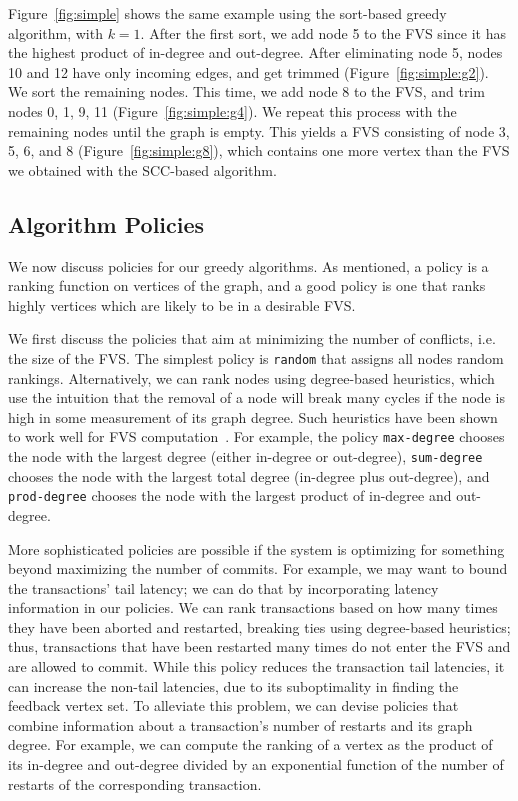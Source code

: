 Figure~\ref{fig:simple} shows the same example using the sort-based greedy algorithm, with $k = 1$. After the first sort, we add node 5 to the FVS since it has the highest product of in-degree and out-degree. After eliminating node 5, nodes 10 and 12 have only incoming edges, and get trimmed (Figure~\ref{fig:simple:g2}). We sort the remaining nodes. This time, we add node 8 to the FVS, and trim nodes 0, 1, 9, 11 (Figure~\ref{fig:simple:g4}). We repeat this process with the remaining nodes until the graph is empty. This yields a FVS consisting of node 3, 5, 6, and 8 (Figure~\ref{fig:simple:g8}), which contains one more vertex than the FVS we obtained with the SCC-based algorithm.


\subsection{Algorithm Policies}
\label{subsec:validator_reordering:policy}

We now discuss policies for our greedy algorithms. As mentioned, a policy is a ranking function on vertices of the graph, and a good policy is one that ranks highly vertices which are likely to be in a desirable FVS. 

We first discuss the policies that aim at minimizing the number of conflicts, i.e. the size of the FVS. The simplest policy is \texttt{random} that assigns all nodes random rankings. Alternatively, we can rank nodes using degree-based heuristics, which use the intuition that the removal of a node will break many cycles if the node is high in some measurement of its graph degree. Such heuristics have  been shown to work well for FVS computation~\cite{cutello2015targeting}. For example, the policy \texttt{max-degree} chooses the node with the largest degree (either in-degree or out-degree), \texttt{sum-degree} chooses the node with the largest total degree (in-degree plus out-degree), and \texttt{prod-degree} chooses the node with the largest product of in-degree and out-degree. 

More sophisticated policies are possible if the system is optimizing for something beyond maximizing the number of commits. For example, we may want to bound the transactions' tail latency; we can do that by incorporating latency information in our policies. We can rank transactions based on how many times they have been aborted and restarted, breaking ties using degree-based heuristics; thus, transactions that have been restarted many times do not enter the FVS and are allowed to commit. While this policy reduces the transaction tail latencies, it can increase the non-tail latencies, due to its suboptimality in finding the feedback vertex set. To alleviate this problem, we can devise policies that combine information about a transaction's number of restarts and its graph degree. For example, we can compute the ranking of a vertex as the product of its in-degree and out-degree divided by an exponential function of the number of restarts of the corresponding transaction. 

